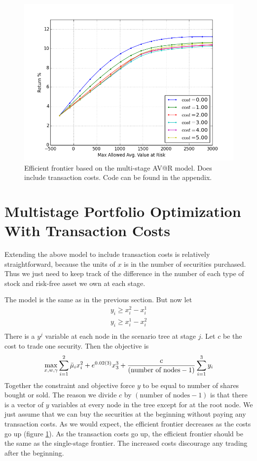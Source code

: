 \documentclass{amsart}
\theoremstyle{definition}
\theoremstyle{remark}
\begin{document}
\begin{figure}
\centering
\includegraphics[scale=0.5]{multi_stage_with_transaction_costs.png}
\caption{Efficient frontier based on the multi-stage AV@R model. Does include transaction costs.  Code can be found in the appendix.}
\label{fig:multi_stage_with_transaction_costs}
\end{figure}

\section{Multistage Portfolio Optimization With Transaction Costs}
Extending the above model to include transaction costs is relatively straightforward, because the units of $x$ is in the number of securities purchased. Thus we just need to keep track of the difference in the number of each type of stock and risk-free asset we own at each stage.

The model is the same as in the previous section. But now let
\begin{align*}
y_i \ge x_i^{2} - x_i^1\\
y_i  \ge x_i^{1} - x_i^{2}\\
\end{align*}
There is a $y^j$ variable at each node in the scenario tree at stage $j$. Let $c$ be the cost to trade one security. Then the objective is
\begin{equation*}
\max_{x,w,\gamma} \sum_{i=1}^2 \bar{\mu}_i x^2_i +  e^{0.02(3)} x_3^3 + \frac{c}{(\text{number of nodes} - 1)}\sum_{i=1}^3 y_i\\
\end{equation*}
Together the constraint and objective  force $y$ to be equal to number of shares bought or sold. The reason we divide $c$ by $(\text{number of nodes}- 1)$ is that there is a vector of $y$ variables at every node in the tree except for at the root node. We just assume that we can buy the securities at the beginning without paying any transaction costs. As we would expect, the efficient frontier decreases as the costs go up (figure \ref{fig:multi_stage_with_transaction_costs}). As the transaction costs go up, the efficient frontier should be the same as the single-stage frontier. The increased costs discourage any trading after the beginning.



\end{document}
